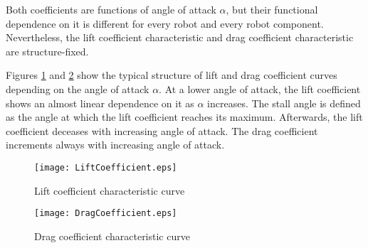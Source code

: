 Both coefficients are functions of angle of attack $\alpha$, but their functional dependence on it is different for every robot and every robot component. Nevertheless, the lift coefficient characteristic and drag coefficient characteristic are structure-fixed.
 
Figures \ref{FIG:LiftCoefficient} and \ref{FIG:DragCoefficient} show the typical structure of lift and drag coefficient curves depending on the angle of attack $\alpha$. At a lower angle of attack, the lift coefficient shows an almost linear dependence on it as $\alpha$ increases. The stall angle is defined as the angle at which the lift coefficient reaches its maximum. Afterwards, the lift coefficient deceases with increasing angle of attack. The drag coefficient increments always with increasing angle of attack.
\begin{figure}
\centering
\texttt{[image: LiftCoefficient.eps]}
\caption{Lift coefficient characteristic curve~\cite{shark}}	
\label{FIG:LiftCoefficient}
\end{figure}
\begin{figure}
\centering
\texttt{[image: DragCoefficient.eps]}
\caption{Drag coefficient characteristic curve~\cite{shark}}	
\label{FIG:DragCoefficient}
\end{figure}
 
